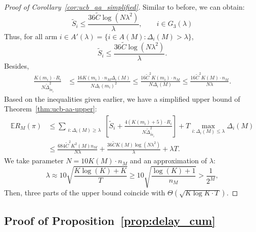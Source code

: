 \documentclass[
  12pt]{article}
\begin{document}
\begin{proof}[Proof of Corollary~\ref{cor:ucb_aa_simplified}]
 Similar to before, we can obtain:
 $$\tilde{S}_i\leq  \frac{36\tilde{C}\log(N \lambda^2)}{\lambda} , \quad \quad   i\in G_3(\lambda)$$
 Thus, for all arm $i\in A'(\lambda)=\{i\in A(M):\Delta_i(M)>\lambda\}$, 
 $$\tilde{S}_i\leq  \frac{36\tilde{C}\log(N \lambda^2)}{\lambda}.$$
 Besides, 
\begin{align*}
    \frac{K(m_i)\cdot R_i}{N \tilde{\Delta}_{\tilde{m}_i}^2}&\leq  \frac{16K(m_i)\cdot n_M\Delta_i(M)}{N \Delta_i(m_i)^2}\leq \frac{16\tilde{C}^2K(m_i)\cdot n_M}{N\Delta_i(M)}\leq \frac{16\tilde{C}^2K(M)\cdot n_M}{N\lambda}.
\end{align*}
 Based on the inequalities given earlier, we have a simplified upper bound of Theorem~\ref{thm:ucb-aa-upper}:
\begin{align*}
\mathbb{E}R_M(\pi)&\leq \sum_{\substack{i: \Delta_i(M) \geq \lambda}} \left[ \tilde{S}_i+\frac{4\left(K(m_i)+5\right)\cdot R_i}{N\tilde{\Delta}_{\tilde{m}_i}^2}\right] +T\max_{i:\Delta_i(M)\leq \lambda}  \Delta_i(M)\\
&\leq\frac{684\tilde{C}^2K^2(M) n_M}{N\lambda}+\frac{36\tilde{C}K(M)\log(N \lambda^2)}{\lambda}+\lambda T.
\end{align*}
We take parameter $N=10 K(M)\cdot n_M $ and an approximation of $\lambda$:
\[\lambda \approx 10\sqrt{\frac{K\log (K)+K}{T}}\geq 10\sqrt{\frac{\log (K)+1}{n_M}}>\frac{1}{2^M},\]
Then, three parts of the upper bound coincide with $\Theta \left(\sqrt{K\log K\cdot T}\right)$.

\end{proof}

\subsection{Proof of Proposition~\ref{prop:delay_cum}}
\label{sec:Proof of prop:delay_cum}
\end{document}
